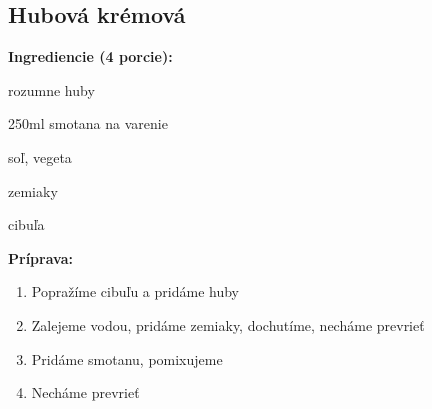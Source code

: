 \setcounter{step}{0}

\subsection{ Hubová krémová }

\begin{ingredient}
  
  \def\portions{  }
  \textbf{ {\normalsize Ingrediencie (4 porcie):} }

  \begin{main}
      \item rozumne huby
      \item 250ml smotana na varenie
      \item soľ, vegeta
      \item zemiaky
      \item cibuľa
  \end{main}
  
\end{ingredient}
\begin{recipe}
\textbf{ {\normalsize Príprava:} }
\begin{enumerate}

  \item{Popražíme cibuľu a pridáme huby}
  \item{Zalejeme vodou, pridáme zemiaky, dochutíme, necháme prevrieť}
  \item{Pridáme smotanu, pomixujeme}
  \item{Necháme prevrieť}

\end{enumerate}
\end{recipe}

\begin{notes}
  
\end{notes}	
\clearpage
